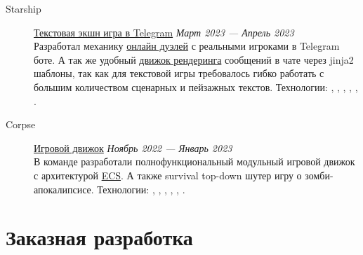 \documentclass[margin,line]{resume}
\begin{document}
\begin{resume}
\begin{description}
    \item[Starship]\small{\href{https://github.com/starship-crew}{Текстовая
        экшн игра в Telegram}
      \hfill \textsl{Март 2023 — Апрель 2023\vspace{1mm}}}\\
      Разработал механику
      \href{https://github.com/starship-crew/telegram-client/blob/main/app/handlers/fight.py}{онлайн
      дуэлей} с реальными игроками в Telegram боте. А
      так же удобный
      \href{https://github.com/starship-crew/telegram-client/blob/main/app/template.py}{движок
      рендеринга}
      сообщений в чате через jinja2 шаблоны, так как для текстовой игры
      требовалось гибко работать с большим количеством сценарных и
      пейзажных текстов.
      Технологии:
      , ,
      ,
      , ,
      .

      \vspace{3mm}

    \item[Corpse]\small{\href{https://github.com/corpse-inc/corpse}{Игровой
        движок}
      \hfill \textsl{Ноябрь 2022 — Январь 2023\vspace{1mm}}}\\
      В команде разработали полнофункциональный модульный
      игровой движок с архитектурой
      \href{https://en.wikipedia.org/wiki/Entity_component_system#:~:text=Entity%E2%80%93component%E2%80%93system%20(ECS,Entity%E2%80%93Component%E2%80%93System%20layout.}{ECS}.
        А также survival top-down шутер игру о зомби-апокалипсисе.
        Технологии:
        , ,
        , , ,
        .

    \end{description}

    \section{\mysidestyle Заказная разработка}\vspace{2mm}


\end{resume}
\end{document}
